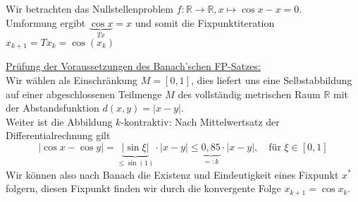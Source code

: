 \documentclass{article}
\begin{document}
\begin{egbox} 
    Wir betrachten das Nullstellenproblem $f:\mathbb{R}\rightarrow\mathbb{R}, x\mapsto \cos x - x = 0$. \\
    Umformung ergibt $\underbrace{\cos x}_{Tx} = x$ und somit die Fixpunktiteration $x_{k+1}=Tx_k=\cos(x_k)$ \\
    \begin{center}
    \end{center}
    \underline{Prüfung der Voraussetzungen des Banach'schen FP-Satzes:} \\
    Wir wählen als Einschränkung $M=[0,1]$, dies liefert uns eine Selbstabbildung auf einer abgeschlossenen 
    Teilmenge $M$ des vollständig metrischen Raum $\mathbb{R}$ mit der Abstandsfunktion $ d(x,y) = |x-y|$. \\
    Weiter ist die Abbildung $k$-kontraktiv:  Nach Mittelwertsatz der Differentialrechnung gilt 
    \[|\cos x - \cos y| = \underbrace{|\sin \xi|}_{\leq \sin(1)}\cdot|x-y|\leq \underbrace{0,85}_{=:k}\cdot |x-y|, 
    \quad \text{für } \xi\in[0,1]\]
    Wir können also nach Banach die Existenz und Eindeutigkeit eines Fixpunkt $x^*$ folgern, diesen Fixpunkt 
    finden wir durch die konvergente Folge $x_{k+1}=\cos x_k$. 
\end{egbox}
\end{document}
